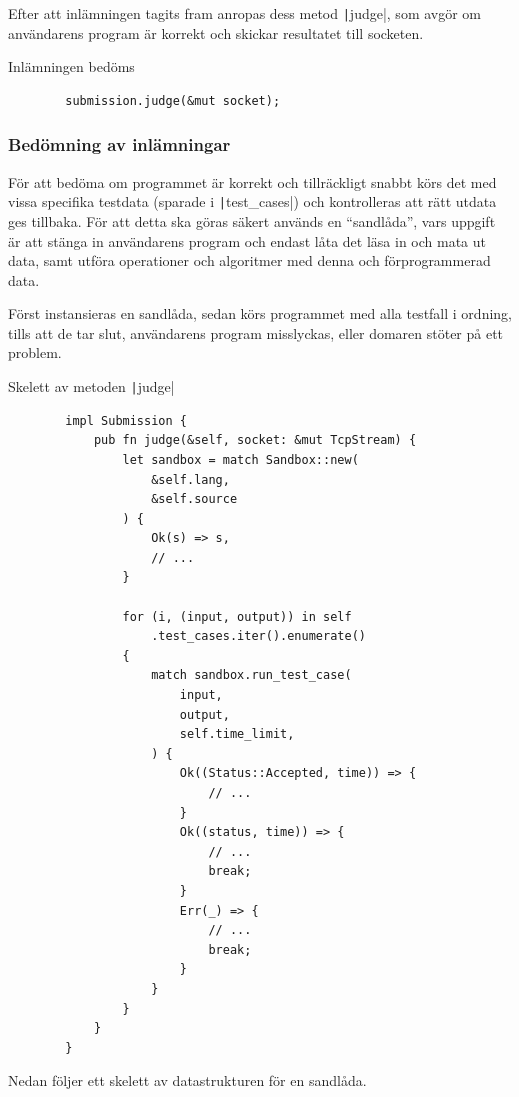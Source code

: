 \documentclass{article}
\begin{document}
Efter att inlämningen tagits fram anropas dess metod
\texttt|judge|, som avgör
om användarens program är korrekt och skickar resultatet till socketen.

\begin{listing}[H]
	\caption{Inlämningen bedöms \label{call-judge}}
	\begin{verbatim}
        submission.judge(&mut socket);
	\end{verbatim}
\end{listing}

\subsubsection{Bedömning av inlämningar}

För att bedöma om programmet är korrekt och tillräckligt snabbt körs det med
vissa specifika testdata (sparade i \texttt|test_cases|) och kontrolleras
att rätt utdata ges tillbaka. För att detta ska göras säkert används en
``sandlåda'', vars uppgift är att stänga in användarens program och endast låta
det läsa in och mata ut data, samt utföra operationer och algoritmer med denna
och förprogrammerad data.

Först instansieras en sandlåda, sedan körs programmet med alla testfall i
ordning, tills att de tar slut, användarens program misslyckas, eller domaren
stöter på ett problem.

\begin{listing}[H]
	\caption{Skelett av metoden
		\texttt|judge|\label{judge-method}}
	\begin{verbatim}
		impl Submission {
			pub fn judge(&self, socket: &mut TcpStream) {
				let sandbox = match Sandbox::new(
					&self.lang,
					&self.source
				) {
					Ok(s) => s,
					// ...
				}

				for (i, (input, output)) in self
					.test_cases.iter().enumerate()
				{
					match sandbox.run_test_case(
						input,
						output,
						self.time_limit,
					) {
						Ok((Status::Accepted, time)) => {
							// ...
						}
						Ok((status, time)) => {
							// ...
							break;
						}
						Err(_) => {
							// ...
							break;
						}
					}
				}
			}
		}
	\end{verbatim}
\end{listing}

Nedan följer ett skelett av datastrukturen för en sandlåda.
\end{document}
